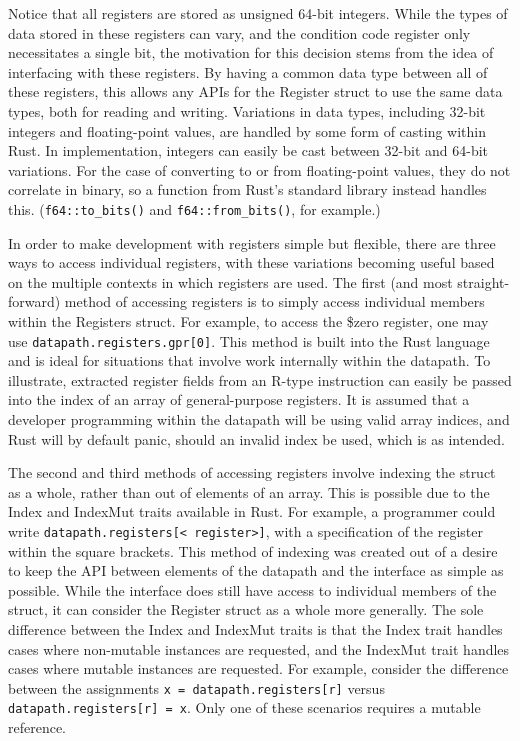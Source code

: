 \documentclass[
    paper=letter,
    parskip=half,
    fontsize=12pt,
    titlepage=firstiscover,
    toc=bibliography,
    numbers=endperiod
]{scrartcl}
\begin{document}
Notice that all registers are stored as unsigned 64-bit integers. While
the types of data stored in these registers can vary, and the condition
code register only necessitates a single bit, the motivation for this
decision stems from the idea of interfacing with these registers. By
having a common data type between all of these registers, this allows
any APIs for the Register struct to use the same data types, both for
reading and writing. Variations in data types, including 32-bit integers
and floating-point values, are handled by some form of casting within
Rust. In implementation, integers can easily be cast between 32-bit and
64-bit variations. For the case of converting to or from floating-point
values, they do not correlate in binary, so a function from Rust's
standard library instead handles this. (\texttt{f64::to\_bits()} and
\texttt{f64::from\_bits()}, for example.)

In order to make development with registers simple but flexible, there
are three ways to access individual registers, with these variations
becoming useful based on the multiple contexts in which registers are
used. The first (and most straight-forward) method of accessing
registers is to simply access individual members within the Registers
struct. For example, to access the \$zero register, one may use
\texttt{datapath.registers.gpr[0]}. This method is built into the Rust
language and is ideal for situations that involve work internally within
the datapath. To illustrate, extracted register fields from an R-type
instruction can easily be passed into the index of an array of
general-purpose registers. It is assumed that a developer programming
within the datapath will be using valid array indices, and Rust will by
default panic, should an invalid index be used, which is as intended.

The second and third methods of accessing registers involve indexing the
struct as a whole, rather than out of elements of an array. This is
possible due to the Index and IndexMut traits available in Rust. For
example, a programmer could write \texttt{datapath.registers[\textless
            register\textgreater]}, with a specification of the register within the
square brackets. This method of indexing was created out of a desire to
keep the API between elements of the datapath and the interface as
simple as possible. While the interface does still have access to
individual members of the struct, it can consider the Register struct as
a whole more generally. The sole difference between the Index and
IndexMut traits is that the Index trait handles cases where non-mutable
instances are requested, and the IndexMut trait handles cases where
mutable instances are requested. For example, consider the difference
between the assignments \texttt{x = datapath.registers[r]} versus
\texttt{datapath.registers[r] = x}. Only one of these scenarios requires
a mutable reference.
\end{document}
